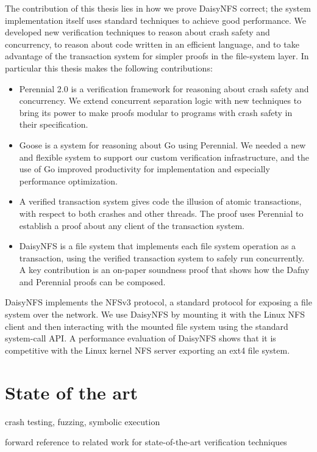 The contribution of this thesis lies in how we prove DaisyNFS correct; the
system implementation itself uses standard techniques to achieve good
performance. We developed new verification techniques to reason about crash
safety and concurrency, to reason about code written in an efficient language,
and to take advantage of the transaction system for simpler proofs in the
file-system layer. In particular this thesis makes the following contributions:
\begin{itemize}
  \item Perennial 2.0 is a verification framework for reasoning about crash
  safety and concurrency. We extend concurrent separation logic with new
  techniques to bring its power to make proofs modular to programs with crash
  safety in their specification.
  \item Goose is a system for reasoning about Go using Perennial. We needed a
  new and flexible system to support our custom verification infrastructure, and
  the use of Go improved productivity for implementation and especially
  performance optimization.
  \item A verified transaction system gives code the
  illusion of atomic transactions, with respect to both crashes and other
  threads. The proof uses Perennial to establish a proof about any client of the
  transaction system.
  \item DaisyNFS is a file system that implements each file system operation as
  a transaction, using the verified transaction system to safely run
  concurrently. A key contribution is an on-paper soundness proof that shows how
  the Dafny and Perennial proofs can be composed.
\end{itemize}

DaisyNFS implements the NFSv3 protocol, a standard protocol for exposing
a file system over the network. We use DaisyNFS by mounting it with the
Linux NFS client and then interacting with the mounted file system using
the standard system-call API. A performance evaluation of DaisyNFS shows
that it is competitive with the Linux kernel NFS server exporting an
ext4 file system.

\section{State of the art}

crash testing, fuzzing, symbolic execution

forward reference to related work for state-of-the-art verification techniques

